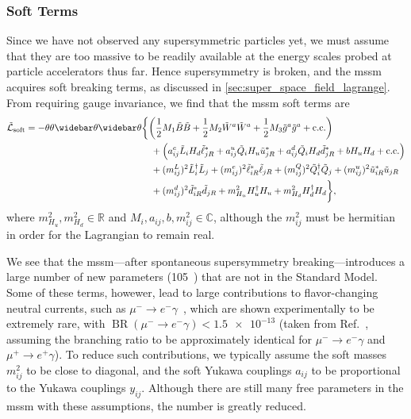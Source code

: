 \subsubsection{Soft Terms}
Since we have not observed any supersymmetric particles yet, we must assume that they are too massive to be readily available at the energy scales probed at particle accelerators thus far.
Hence supersymmetry is broken, and the \gls{mssm} acquires soft breaking terms, as discussed in \cref{sec:super_space_field_lagrange}.
From requiring gauge invariance, we find that the \gls{mssm} soft terms are
\begin{equation}
\label{eq:soft_terms}
\begin{split}
    \tilde{\mathcal{L}}_{\text{soft}} = -\thetafour &\biggl\{
        \biggl(\frac{1}{2}M_1 \tilde{B} \tilde{B} + \frac{1}{2}M_2 \tilde{W}^a \tilde{W}^a + \frac{1}{2}M_3 \tilde{g}^a\tilde{g}^a + \text{c.c.}\biggr)
        \\ &\quad
        +\Bigl(a_{ij}^e \tilde{L}_i H_d \slepton_{jR}^* + a_{ij}^u \tilde{Q}_i H_u \tilde{u}_{jR}^* + a_{ij}^d \tilde{Q}_i H_d \tilde{d}_{jR}^* +bH_uH_d + \text{c.c.}\Bigr)
        \\ &\quad
        +(m_{ij}^L)^2 \tilde{L}_i^\dagger\tilde{L}_j + (m_{ij}^e)^2 \slepton_{iR}^*\slepton_{jR} + (m_{ij}^Q)^2 \tilde{Q}_i^\dagger \tilde{Q}_j + (m_{ij}^u)^2 \tilde{u}_{iR}^*\tilde{u}_{jR}
        \\ &\quad
        + (m_{ij}^d)^2 \tilde{d}_{iR}^* \tilde{d}_{jR} + m_{H_u}^2 H_u^\dagger H_u + m_{H_d}^2 H_d^\dagger H_d
    \biggr\},
\end{split}
\end{equation}
where $m_{H_u}^2,m_{H_d}^2 \in \mathbb{R}$ and $M_i,a_{ij},b,m_{ij}^2 \in \mathbb{C}$, although the $m_{ij}^2$ must be hermitian in order for the Lagrangian to remain real.

We see that the \gls{mssm}---after spontaneous supersymmetry breaking---introduces a large number of new parameters (\num{105}~\cite{Martin:1997ns}) that are not in the Standard Model.
Some of these terms, howewer, lead to large contributions to flavor-changing neutral currents, such as $\mu^- \to e^-\gamma$~\cite{Martin:1997ns}, which are shown experimentally to be extremely rare, with $\operatorname{BR}(\mu^-\to e^-\gamma) < \num{1.5e-13}$ (taken from Ref.~\cite{MEGII:2025gzr}, assuming the branching ratio to be approximately identical for $\mu^-\to e^-\gamma$ and $\mu^+\to e^+\gamma$).
To reduce such contributions, we typically assume the soft masses $m_{ij}^2$ to be close to diagonal, and the soft Yukawa couplings $a_{ij}$ to be proportional to the Yukawa couplings $y_{ij}$.
Although there are still many free parameters in the \gls{mssm} with these assumptions, the number is greatly reduced.




